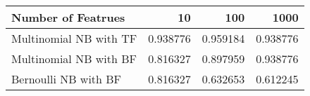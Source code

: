\begin{tabular}{lrrr}
\toprule
Number of Featrues &      10   &      100  &      1000 \\
\midrule
Multinomial NB with TF &  0.938776 &  0.959184 &  0.938776 \\
Multinomial NB with BF &  0.816327 &  0.897959 &  0.938776 \\
Bernoulli NB with BF   &  0.816327 &  0.632653 &  0.612245 \\
\bottomrule
\end{tabular}
